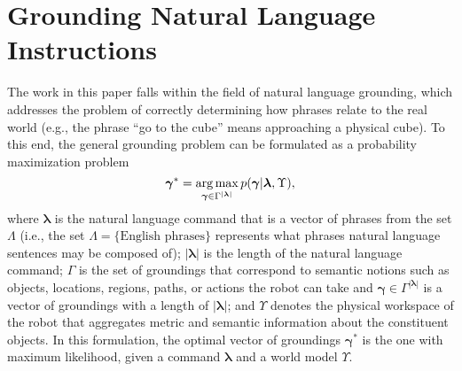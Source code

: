 \section{Grounding Natural Language Instructions}
\label{sec:background}
The work in this paper falls within the field of natural language grounding, which addresses the problem of correctly determining how phrases relate to the real world (e.g., the phrase ``go to the cube'' means approaching a physical cube).
To this end, the general grounding problem can be formulated as a probability maximization problem
\begin{equation}
\boldsymbol{\gamma}^* = \operatorname*{\arg\max}_{\boldsymbol{\gamma} \in \Gamma^{|\boldsymbol{\lambda}|}} p(\boldsymbol{\gamma}|\boldsymbol{\lambda},\Upsilon),
\label{eq:max_ground_prob}
\end{equation}
where $\boldsymbol{\lambda}$ is the natural language command that is a vector of phrases from the set $\Lambda$ (i.e.,  the set ${\Lambda = \{\text{English phrases}\}}$ represents what phrases natural language sentences may be composed of); $|\boldsymbol{\lambda}|$ is the length of the natural language command; ${\Gamma}$ is the set of groundings that correspond to semantic notions such as objects, locations, regions, paths, or actions the robot can take and $\boldsymbol{\gamma} \in \Gamma^{|\boldsymbol{\lambda}|}$ is a vector of groundings with a length of $|\boldsymbol{\lambda}|$; and $\Upsilon$ denotes the physical workspace of the robot that aggregates metric and semantic information about the constituent objects. In this formulation, the optimal vector of groundings $\boldsymbol{\gamma}^*$ is the one with maximum likelihood, given a command $\boldsymbol{\lambda}$ and a world model $\Upsilon$.



